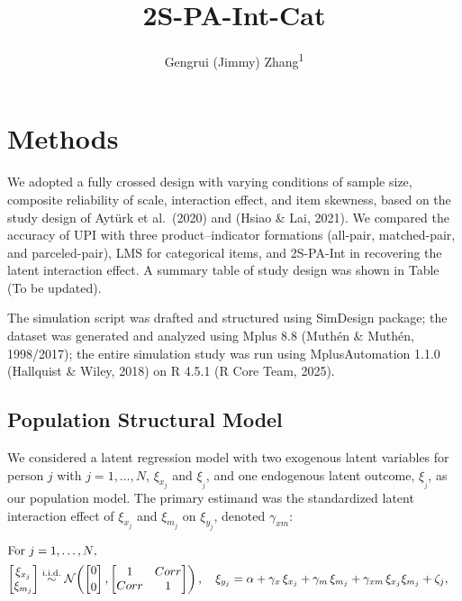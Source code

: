 \documentclass[
  man]{apa6}
\title{2S-PA-Int-Cat}
\author{Gengrui (Jimmy) Zhang\textsuperscript{1}}
\date{}
\affiliation{\vspace{0.5cm}\textsuperscript{1} University of Southhern California}
\begin{document}
\maketitle

\section{Methods}\label{methods}

We adopted a fully crossed design with varying conditions of sample
size, composite reliability of scale, interaction effect, and item
skewness, based on the study design of Aytürk et al.~(2020) and (Hsiao \& Lai, 2021). We compared the accuracy of UPI
with three product--indicator formations (all-pair, matched-pair, and
parceled-pair), LMS for categorical items, and 2S-PA-Int in recovering
the latent interaction effect. A summary table of study design was shown in Table (To be updated).

The simulation script was drafted and structured using SimDesign package; the dataset was generated and analyzed using Mplus 8.8 (Muthén \& Muthén, 1998/2017); the entire simulation study was run using MplusAutomation 1.1.0 (Hallquist \& Wiley, 2018) on R 4.5.1 (R Core Team, 2025).

\subsection{Population Structural Model}\label{population-structural-model}

We considered a latent regression model with two exogenous latent
variables for person \(j\) with \(j=1,\ldots,N\), \(\xi_{x_{j}}\) and
\(\xi_{_{j}}\), and one endogenous latent outcome, \(\xi_{_{j}}\), as our
population model. The primary estimand was the standardized latent
interaction effect of \(\xi_{x_{j}}\) and \(\xi_{m_{j}}\) on \(\xi_{y_{j}}\),
denoted \(\gamma_{xm}\):

\begin{align}
\intertext{For $j=1,\ldots,N$,}
\begin{bmatrix}\xi_{x_{j}} \\ \xi_{m_{j}}\end{bmatrix}
&\stackrel{\text{i.i.d.}}{\sim}
\mathcal{N}\!\left(
\begin{bmatrix}0\\[2pt]0\end{bmatrix},
\begin{bmatrix}1 & Corr \\ Corr & 1\end{bmatrix}
\right),\quad
\xi_{y_{j}} = \alpha + \gamma_{x}\,\xi_{x_{j}} + \gamma_{m}\,\xi_{m_{j}}
             + \gamma_{xm}\,\xi_{x_{j}}\xi_{m_{j}} + \zeta_{j},
\end{align}
\end{document}
